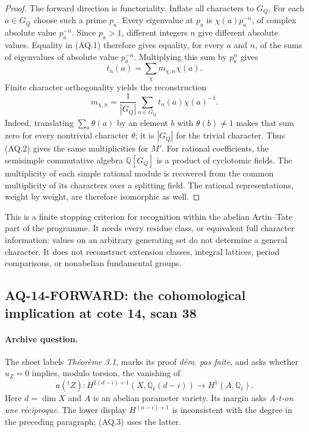 \begin{proof}
The forward direction is functoriality. Inflate all characters to $G_Q$.
For each $a\in G_Q$ choose such a prime $p_a$.
Every eigenvalue at $p_a$ is $\chi(a)p_a^{-n}$, of complex absolute
value $p_a^{-n}$. Since $p_a>1$, different integers $n$ give different
absolute values. Equality in (AQ.1) therefore gives equality,
for every $a$ and $n$, of the sums of eigenvalues of absolute
value $p_a^{-n}$. Multiplying this sum by $p_a^n$ gives
\[
 t_n(a)=\sum_\chi m_{\chi,n}\chi(a).
\]
Finite character orthogonality yields the reconstruction
\[
 m_{\chi,n}=\frac1{|G_Q|}\sum_{a\in G_Q}
             t_n(a)\chi(a)^{-1}.                                \tag{AQ.2}
\]
Indeed, translating $\sum_a\theta(a)$ by an element $b$ with
$\theta(b)\ne1$ makes that sum zero for every nontrivial character
$\theta$; it is $|G_Q|$ for the trivial character. Thus (AQ.2)
gives the same multiplicities for $M'$.
For rational coefficients, the semisimple commutative algebra
$\mathbb Q[G_Q]$ is a product of cyclotomic fields. The
multiplicity of each simple rational module is recovered from
the common multiplicity of its characters over a splitting field.
The rational representations, weight by weight, are therefore
isomorphic as well.
\end{proof}

This is a finite stopping criterion for recognition within the
abelian Artin--Tate part of the programme. It needs every residue
class, or equivalent full character information: values on an
arbitrary generating set do not determine a general character.
It does not reconstruct extension classes, integral lattices,
period comparisons, or nonabelian fundamental groups.

\subsection{AQ-14-FORWARD: the cohomological implication at cote 14, scan 38}
\paragraph{Archive question.}
The sheet labels \emph{Th\'eor\`eme 3.1}, marks its proof
\emph{d\'em. pas faite}, and asks whether $u_Z=0$ implies,
modulo torsion, the vanishing of
\[
 a({}^tZ):H^{2(d-i)+1}(X,\mathbb Q_\ell(d-i))
                     \longrightarrow H^1(A,\mathbb Q_\ell).
                                                               \tag{AQ.3}
\]
Here $d=\dim X$ and $A$ is an abelian parameter variety.
Its margin asks \emph{A-t-on une r\'eciproque}.
The lower display $H^{(n-i)+1}$ is inconsistent with the
degree in the preceding paragraph; (AQ.3) uses the latter.

